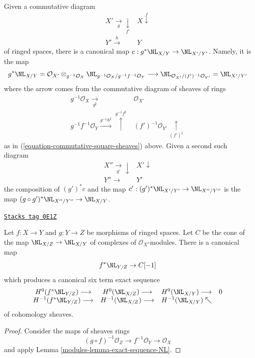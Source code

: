 Given a commutative diagram
$$
\begin{array}{cc}X' \underset{g}{\longrightarrow}\underset{f'}{\downarrow} & X \overset{f}{\downarrow} \\ Y' \overset{h}{\longrightarrow} & Y\end{array}
$$
of ringed spaces, there is a canonical map $c : g^*\NL_{X/Y} \to \NL_{X'/Y'}$.
Namely, it is the map
$$
g^*\NL_{X/Y} =
\mathcal{O}_{X'} \otimes_{g^{-1}\mathcal{O}_X}
\NL_{g^{-1}\mathcal{O}_X/g^{-1}f^{-1}\mathcal{O}_Y}
\longrightarrow
\NL_{\mathcal{O}_{X'}/(f')^{-1}\mathcal{O}_{Y'}} = \NL_{X'/Y'}
$$
where the arrow comes from the commutative diagram of sheaves of rings
$$
\begin{array}{cc}g^{-1}\mathcal{O}_X \underset{g^\sharp}{\longrightarrow} & \mathcal{O}_{X'} \\ g^{-1}f^{-1}\mathcal{O}_Y
\overset{g^{-1}h^\sharp}{\longrightarrow}\overset{g^{-1}f^\sharp}{\uparrow} & (f')^{-1}\mathcal{O}_{Y'} \underset{(f')^\sharp}{\uparrow}\end{array}
$$
as in (\ref{equation-commutative-square-sheaves}) above.
Given a second such diagram
$$
\begin{array}{cc}X'' \underset{g'}{\longrightarrow}\downarrow & X' \downarrow \\ Y'' \longrightarrow & Y'\end{array}
$$
the composition of $(g')^*c$ and the map
$c' : (g')^*\NL_{X'/Y'} \to \NL_{X''/Y''}$
is the map $(g \circ g')^*\NL_{X''/Y''} \to \NL_{X/Y}$.

\begin{lemma}
\label{modules-lemma-exact-sequence-NL-ringed-topoi}
\href{https://stacks.math.columbia.edu/tag/0E1Z}{\texttt{Stacks tag 0E1Z}}

Let $f : X \to Y$ and $g : Y \to Z$ be morphisms of ringed spaces.
Let $C$ be the cone of the map $\NL_{X/Z} \to \NL_{X/Y}$ of complexes
of $\mathcal{O}_X$-modules. There is a canonical map
$$
f^*\NL_{Y/Z} \to C[-1]
$$
which produces a canonical six term exact sequence
$$
\begin{array}{cccc}H^0(f^*\NL_{Y/Z}) \longrightarrow & H^0(\NL_{X/Z}) \longrightarrow & H^0(\NL_{X/Y}) \longrightarrow & 0 \\ H^{-1}(f^*\NL_{Y/Z}) \longrightarrow & H^{-1}(\NL_{X/Z}) \longrightarrow & H^{-1}(\NL_{X/Y}) \nwarrow & \end{array}
$$
of cohomology sheaves.
\end{lemma}

\begin{proof}

Consider the maps of sheaves rings
$$
(g \circ f)^{-1}\mathcal{O}_Z \to f^{-1}\mathcal{O}_Y \to \mathcal{O}_X
$$
and apply Lemma \ref{modules-lemma-exact-sequence-NL}.
\end{proof}



